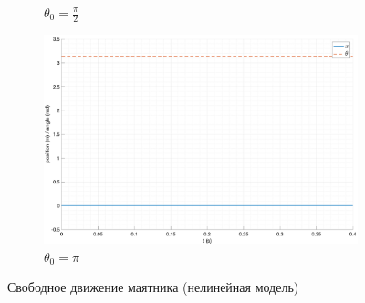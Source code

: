 \begin{figure}[ht!]
\begin{subfigure}[b]{0.45\textwidth}
        \caption{$\theta_0 = \frac{\pi}{2}$}
    \end{subfigure}
    \begin{subfigure}[b]{0.45\textwidth}
        \includegraphics[width=\textwidth]{media/plots/free_motion/nonlin_6.png}
        \caption{$\theta_0 = \pi$}
    \end{subfigure}
    \caption{Свободное движение маятника (нелинейная модель)}
    \label{fig:free_motion_nonlinear}
\end{figure}

